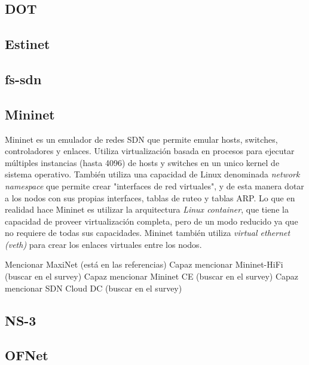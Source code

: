 \subsection{DOT} %
\subsection{Estinet} %
\subsection{fs-sdn} %
\subsection{Mininet} %
Mininet es un emulador de redes SDN que permite emular hosts, switches, controladores y enlaces. Utiliza virtualización basada en procesos para ejecutar múltiples instancias (hasta 4096) de hosts y switches en un unico kernel de sistema operativo. También utiliza una capacidad de Linux denominada \textit{network namespace} que permite crear "interfaces de red virtuales", y de esta manera dotar a los nodos con sus propias interfaces, tablas de ruteo y tablas ARP. Lo que en realidad hace Mininet es utilizar la arquitectura \textit{Linux container}, que tiene la capacidad de proveer virtualización completa, pero de un modo reducido ya que no requiere de todas sus capacidades. Mininet también utiliza \textit{virtual ethernet (veth)} para crear los enlaces virtuales entre los nodos.

Mencionar MaxiNet (está en las referencias)
Capaz mencionar Mininet-HiFi (buscar en el survey) %
Capaz mencionar Mininet CE (buscar en el survey)
Capaz mencionar SDN Cloud DC (buscar en el survey)
\subsection{NS-3} %
\subsection{OFNet} %

